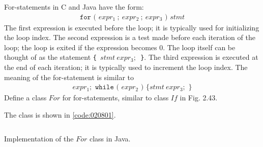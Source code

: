 \begin{exercise}\label{ex:020801}
    For-statements in C and Java have the form:
    \begin{align*}
        \texttt{for ( } expr_1\ ;\ expr_2\ ;\ expr_3 \texttt{ ) } stmt
    \end{align*}
    The first expression is executed before the loop; it is typically used for 
    initializing the loop index. The second expression is a test made before 
    each iteration of the loop; the loop is exited if the expression becomes 0. 
    The loop itself can be thought of as the statement 
    \texttt{\{ }$stmt\ expr_3;$\texttt{ \}}. The third expression is executed at 
    the end of each iteration; it is typically used to increment the loop index. 
    The meaning of the for-statement is similar to
    \begin{align*}
        expr_1; \texttt{ while ( } expr_2 \texttt{ ) \{ }stmt\ expr_3; \texttt{ \}}
    \end{align*}
    Define a class $For$ for for-statements, similar to class $If$ in Fig. 2.43.
\end{exercise}
\begin{solution}\label{sol:020801}
    The class is shown in \cref{code:020801}.
    \begin{listing}[!ht]
        \inputminted[linenos=true, frame=single, breaklines=true]{java}{02/08/01/ex020801.java}
        \caption{Implementation of the $For$ class in Java.}
        \label{code:020801}
    \end{listing}
\end{solution}